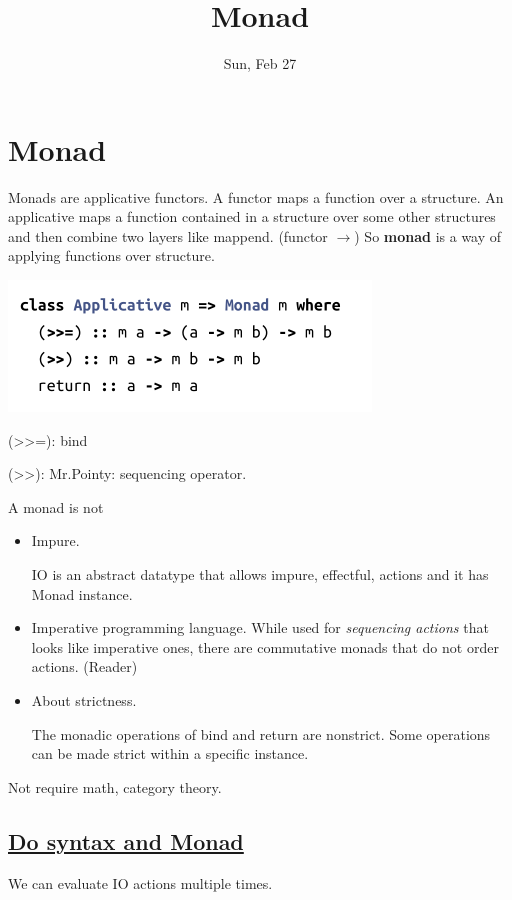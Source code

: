 \documentclass{article}
\title{Monad}
\date{Sun, Feb 27}
\author{}
\begin{document}
\section{Monad}

 Monads are applicative functors. A functor maps a function over a structure. An applicative maps
 a function contained in a structure over some other structures and then combine two layers like {\selectfont mappend}. ({\selectfont functor $\to$})
So \textbf{monad} is a way of applying functions over structure.

\includegraphics[width = 6 cm]{./images/monad.png} 

{\selectfont (>>=): } bind

{\selectfont (>>): }  Mr.Pointy: sequencing operator.

A monad is not
\begin{itemize}
  \renewcommand\labelitemi{{\footnotesize \textcolor{blue5}{$\blacksquare$}} }
  \item Impure. 

    {\selectfont IO} is an abstract datatype that allows impure, effectful, actions and it has {\selectfont Monad} instance.
  \item Imperative programming language. While used  for \textit{sequencing actions} that looks like imperative ones, there are commutative monads that do not order actions. ({\selectfont Reader})
  \item About strictness.

    The monadic operations of {\selectfont bind} and {\selectfont return} are nonstrict. Some operations can be made strict within a specific instance.

\end{itemize}
Not require math, category theory.

\subsection*{{\selectfont \underline{Do syntax and Monad}}}  
We can evaluate {\selectfont IO} actions multiple times.
\end{document}
